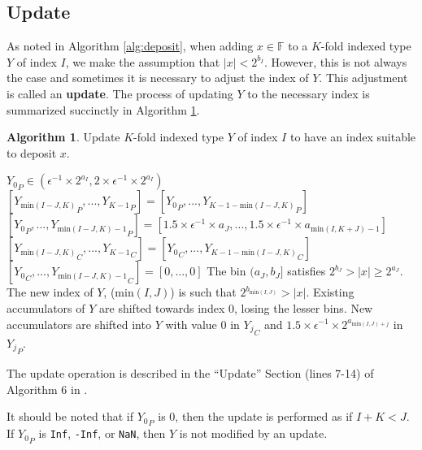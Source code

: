 \documentclass[12pt]{article}
\providecommand{\F}{\ensuremath{\mathbb{F}}}
\providecommand{\min}{\ensuremath{\text{min}}}
\theoremstyle{definition}
\newtheorem{alg}{Algorithm}[section]
\numberwithin{equation}{section}
\numberwithin{figure}{section}
\begin{document}
  \subsection{Update}
    \label{sec:primitiveops_update}
    As noted in Algorithm \ref{alg:deposit}, when adding $x \in \F$ to a $K$-fold indexed type $Y$ of index $I$, we make the assumption that $|x| < 2^{b_I}$. However, this is not always the case and sometimes it is necessary to adjust the index of $Y$. This adjustment is called an \textbf{update}. The process of updating $Y$ to the necessary index is summarized succinctly in Algorithm \ref{alg:update}.

    \begin{samepage}
    \begin{alg}
      Update $K$-fold indexed type $Y$ of index $I$ to have an index suitable to deposit $x$.
      \begin{algorithmic}[1]
        \Require
          \Statex ${Y_0}_P \in (\epsilon^{-1} \times 2^{a_{I}}, 2 \times \epsilon^{-1} \times 2^{a_I})$
          \State {}
          \State {}
            \State $[{Y_{\min(I - J, K)}}_P, ..., {Y_{K - 1}}_P] = [{Y_0}_P, ..., {Y_{K - 1 - \min(I - J, K)}}_P]$
            \State $[{Y_0}_P, ..., {Y_{\min(I - J, K) - 1}}_P] = [1.5 \times \epsilon^{-1} \times a_{J}, ..., 1.5 \times \epsilon^{-1} \times a_{\min(I, K + J) - 1}]$
            \State $[{Y_{\min(I - J, K)}}_C, ..., {Y_{K - 1}}_C] = [{Y_0}_C, ..., {Y_{K - 1 - \min(I - J, K)}}_C]$
            \State $[{Y_0}_C, ..., {Y_{\min(I - J, K) - 1}}_C] = [0, ..., 0]$
          \EndIf
        \EndFunction
        \Ensure
          \Statex The bin $(a_{J}, b_{J}]$ satisfies $2^{b_{J}} > |x| \geq 2^{a_{J}}$.
          \Statex The new index of $Y$, ($\min(I, J)$) is such that $2^{b_{\min(I, J)}} > |x|$.
          \Statex Existing accumulators of $Y$ are shifted towards index $0$, losing the lesser bins.
          \Statex New accumulators are shifted into $Y$ with value $0$ in ${Y_j}_C$ and $1.5 \times \epsilon^{-1} \times 2^{a_{\min(I, J) + j}}$ in ${Y_j}_P$.
      \end{algorithmic}
      \label{alg:update}
    \end{alg}
    \end{samepage}

    The update operation is described in the ``Update'' Section (lines 7-14) of Algorithm $6$ in \cite{repsum}.

    It should be noted that if ${Y_0}_P$ is 0, then the update is performed as if $I + K < J$. If ${Y_0}_P$ is \texttt{Inf}, \texttt{-Inf}, or \texttt{NaN}, then $Y$ is not modified by an update.
\end{document}
